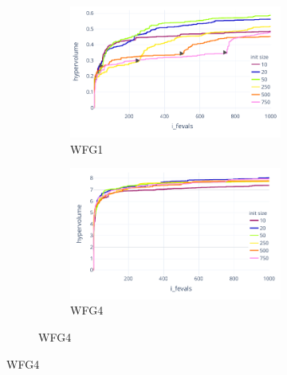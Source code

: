     \begin{figure}
        \centering
        \begin{subfigure}{\textwidth}
            \begin{subfigure}{0.45\textwidth}
                \includegraphics[width=\textwidth]{content/images/hypermapper_wfg1_start_set}
                \caption{WFG1}
                \label{fig:hmapper_wfg1_start_set}
            \end{subfigure}
            \begin{subfigure}{0.45\textwidth}
                \includegraphics[width=\textwidth]{content/images/hypermapper_wfg4_start_set}
                \caption{WFG4}
                \label{fig:hmapper_wfg4_start_set}
            \end{subfigure}
        \end{subfigure} 
        \hfill


\end{figure}
